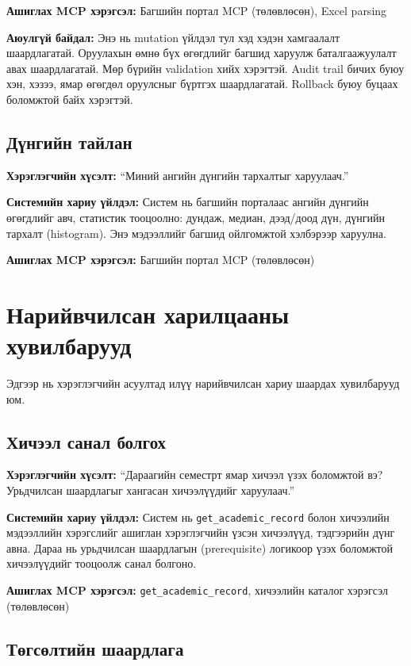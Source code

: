 \textbf{Ашиглах MCP хэрэгсэл:} Багшийн портал MCP (төлөвлөсөн), Excel parsing

\textbf{Аюулгүй байдал:} Энэ нь mutation үйлдэл тул хэд хэдэн хамгаалалт шаардлагатай. Оруулахын өмнө бүх өгөгдлийг багшид харуулж баталгаажуулалт авах шаардлагатай. Мөр бүрийн validation хийх хэрэгтэй. Audit trail бичих буюу хэн, хэзээ, ямар өгөгдөл оруулсныг бүртгэх шаардлагатай. Rollback буюу буцаах боломжтой байх хэрэгтэй.

\subsection{Дүнгийн тайлан}

\textbf{Хэрэглэгчийн хүсэлт:} ``Миний ангийн дүнгийн тархалтыг харуулаач.''

\textbf{Системийн хариу үйлдэл:} Систем нь багшийн порталаас ангийн дүнгийн өгөгдлийг авч, статистик тооцоолно: дундаж, медиан, дээд/доод дүн, дүнгийн тархалт (histogram). Энэ мэдээллийг багшид ойлгомжтой хэлбэрээр харуулна.

\textbf{Ашиглах MCP хэрэгсэл:} Багшийн портал MCP (төлөвлөсөн)

\section{Нарийвчилсан харилцааны хувилбарууд}

Эдгээр нь хэрэглэгчийн асуултад илүү нарийвчилсан хариу шаардах хувилбарууд юм.

\subsection{Хичээл санал болгох}

\textbf{Хэрэглэгчийн хүсэлт:} ``Дараагийн семестрт ямар хичээл үзэх боломжтой вэ? Урьдчилсан шаардлагыг хангасан хичээлүүдийг харуулаач.''

\textbf{Системийн хариу үйлдэл:} Систем нь \texttt{get\_academic\_record} болон хичээлийн мэдээллийн хэрэгслийг ашиглан хэрэглэгчийн үзсэн хичээлүүд, тэдгээрийн дүнг авна. Дараа нь урьдчилсан шаардлагын (prerequisite) логикоор үзэх боломжтой хичээлүүдийг тооцоолж санал болгоно.

\textbf{Ашиглах MCP хэрэгсэл:} \texttt{get\_academic\_record}, хичээлийн каталог хэрэгсэл (төлөвлөсөн)

\subsection{Төгсөлтийн шаардлага}

